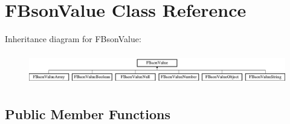 \hypertarget{class_f_bson_value}{}\section{F\+Bson\+Value Class Reference}
\label{class_f_bson_value}
Inheritance diagram for F\+Bson\+Value\+:\begin{figure}[H]
\begin{center}
\leavevmode
\includegraphics[height=1.382716cm]{class_f_bson_value}
\end{center}
\end{figure}
\subsection*{Public Member Functions}
